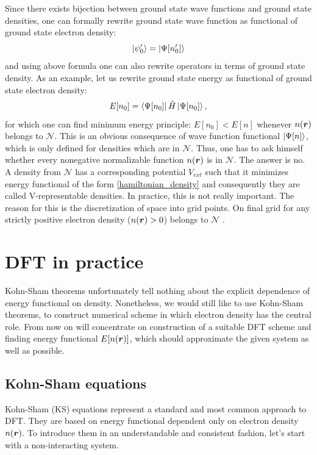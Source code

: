 \documentclass[openany, longbibliography,slovene,a4paper,12pt]{article}
\def\vec#1{\mbox{\boldmath$#1$}}
\begin{document}
Since there exists bijection between ground state wave functions and ground
state densities, one can formally rewrite ground state wave function as
functional of ground state electron density:
\begin{equation}
  \ket{\psi'_0} =  \ket{\Psi[n'_0]}
  \end{equation}
and using above formula one can also rewrite operators in terms of ground state
density. As an example, let us rewrite ground state energy as functional of
ground state electron density:
\begin{equation} \label{hamiltonian_density}
  E[n_0] = \bra{\Psi[n_0]}\hat H \ket{\Psi[n_0]},
  \end{equation}
for which one can find minimum energy principle: $E[n_0]<E[n]$ whenever $n(\vec r)$
belongs to $\mathcal N$. This is an obvious consequence of wave function functional
$\ket{\Psi [n]}$, which is only defined for densities which are in $\mathcal N$.
Thus, one has to ask himself whether every nonegative normalizable function
$n(\vec r)$ is in $\mathcal N$.  The answer is no. A density from $\mathcal N$
has a corresponding potential $V_{ext}$ such that it minimizes energy functional
of the form \ref{hamiltonian_density} and consequently they are called V-representable densities.
In practice, this is not really important. The reason for this is the discretization of space
into grid points. On final grid for any strictly positive electron density
($n(\vec r) > 0$) belongs to $\mathcal N$ \cite{advanced_course}.


  \section{DFT in practice}
Kohn-Sham theorems unfortunately tell nothing about the explicit dependence of
energy functional on density. Nonetheless, we would still like to use Kohn-Sham
theorems, to construct numerical scheme in which electron density has the central
role. From now on will concentrate on construction of a suitable DFT scheme and
finding energy functional $E[n(\vec r)]$, which should approximate the given
system as well as possible.
  
  \subsection{Kohn-Sham equations}
  Kohn-Sham (KS) equations represent a standard and most common approach to DFT.
  They are based on energy functional dependent only on electron density $n(\vec
  r)$. To introduce them in an understandable and consistent fashion, let's start with a non-interacting system. 
 
\end{document}
